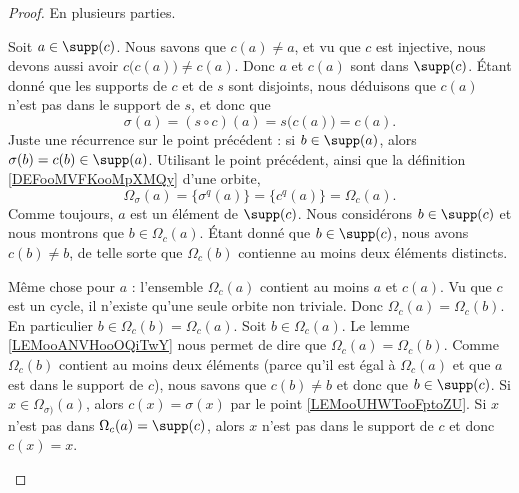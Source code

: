 \begin{proof}
	En plusieurs parties.
	\begin{subproof}
		\spitem[Si \( a\in \supp(c)\), alors \( c(a)=\sigma(a)\)]
		Soit \( a\in \supp(c)\). Nous savons que \( c(a)\neq a\), et vu que \( c\) est injective, nous devons aussi avoir \( c\big( c(a) \big)\neq c(a)\). Donc \( a\) et \( c(a)\) sont dans \( \supp(c)\). Étant donné que les supports de \( c\) et de \( s\) sont disjoints, nous déduisons que \( c(a)\) n'est pas dans le support de \( s\), et donc que
		\begin{equation}
			\sigma(a)=(s\circ c)(a)=s\big( c(a) \big)=c(a).
		\end{equation}
		\spitem[\( \sigma^q(a)=c^q(a)\)]
		Juste une récurrence sur le point précédent : si \( b\in\supp(a)\), alors \( \sigma(b)=c(b)\in\supp(a)\).
		\spitem[Si \( a\in \supp(c)\), alors \( \Omega_{\sigma}(a)=\Omega_c(a)\)]
		Utilisant le point précédent, ainsi que la définition \ref{DEFooMVFKooMpXMQy} d'une orbite,
		\begin{equation}
			\Omega_{\sigma}(a)=\{ \sigma^q(a) \}=\{ c^q(a) \}=\Omega_c(a).
		\end{equation}
		Comme toujours, \( a\) est un élément de \( \supp(c)\). Nous considérons \( b\in\supp(c)\) et nous montrons que \( b\in \Omega_c(a)\). Étant donné que \( b\in\supp(c)\), nous avons \( c(b)\neq b\), de telle sorte que \( \Omega_c(b)\) contienne au moins deux éléments distincts.

		Même chose pour \( a\) : l'ensemble \( \Omega_c(a)\) contient au moins \( a\) et \( c(a)\). Vu que \( c\) est un cycle, il n'existe qu'une seule orbite non triviale. Donc \( \Omega_c(a)=\Omega_c(b)\). En particulier \( b\in\Omega_c(b)=\Omega_c(a)\).
		Soit \( b\in \Omega_c(a)\). Le lemme \ref{LEMooANVHooOQiTwY} nous permet de dire que \( \Omega_c(a)=\Omega_c(b)\). Comme \( \Omega_c(b)\) contient au moins deux éléments (parce qu'il est égal à \( \Omega_c(a)\) et que \( a\) est dans le support de \( c\)), nous savons que \( c(b)\neq b\) et donc que \( b\in\supp(c)\).
		Si \( x\in \Omega_{\sigma)}(a)\), alors \( c(x)=\sigma(x)\) par le point \ref{LEMooUHWTooFptoZU}. Si \( x\) n'est pas dans \( \Omega_c(a)=\supp(c)\), alors \( x\) n'est pas dans le support de \( c\) et donc \( c(x)=x\).
	\end{subproof}
\end{proof}

